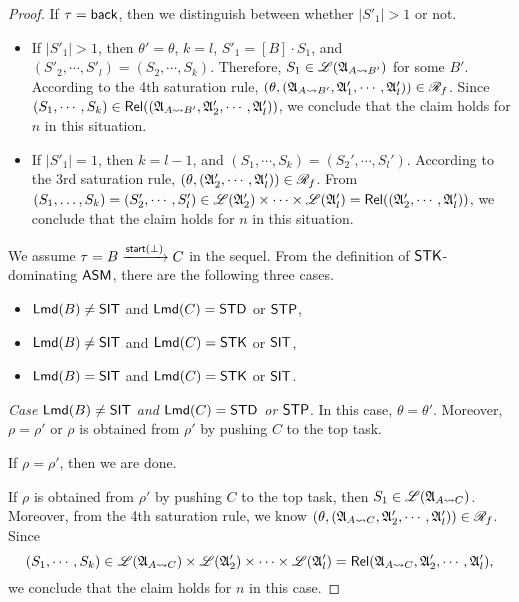 \begin{proof}
If $\tau = {\mathsf{back} }$, then we distinguish between whether $|S'_1| > 1$ or not. 
\begin{itemize}
\item If $|S'_1| > 1$, then $\theta' = \theta$, $k=l$, $S'_1 = [B] \cdot S_1$, and $(S'_2, \cdots, S'_l) = (S_2, \cdots, S_k)$. 
Therefore, $S_1 \in {\mathscr{L} }({\mathfrak{A} }_{A \rightsquigarrow B'})$ for some $B'$. According to the 4th saturation rule, $(\theta, ({\mathfrak{A} }_{A \rightsquigarrow B'}, {\mathfrak{A} }'_1, \cdots, {\mathfrak{A} }'_l)) \in \mathscr{R}_f$. Since $(S_1, \cdots, S_k) \in \mathsf{Rel}(({\mathfrak{A} }_{A \rightsquigarrow B'}, {\mathfrak{A} }'_2, \cdots, {\mathfrak{A} }'_l))$, we conclude that the claim holds for $n$ in this situation. 
%
\item If $|S'_1| = 1$, then $k = l - 1$, and $(S_1,\cdots,S_k) = (S_2',\cdots,S_l')$. According to the 3rd saturation rule, $(\theta, ({\mathfrak{A} }_2',\cdots,{\mathfrak{A} }_l')) \in \mathscr{R}_f$. From $(S_1,\dots,S_k) = (S'_2, \cdots, S'_l) \in {\mathscr{L} }({\mathfrak{A} }_2') \times \cdots \times {\mathscr{L} }({\mathfrak{A} }_l') = \mathsf{Rel}(({\mathfrak{A} }'_2, \cdots, {\mathfrak{A} }'_l))$, we conclude that the claim holds for $n$ in this situation. 
\end{itemize}


We assume $\tau = B \xrightarrow{{\mathsf{start} }(\bot)} C$ in the sequel. From the definition of ${\sf STK}$-dominating $\textsf{ASM}$, there are the following three cases. 
\begin{itemize}
\item ${\sf Lmd}(B) \neq {\sf SIT}$ and ${\sf Lmd}(C) = {\sf STD}$ or ${\sf STP}$, 
%
\item ${\sf Lmd}(B) \neq {\sf SIT}$ and ${\sf Lmd}(C) = {\sf STK}$ or ${\sf SIT}$, 
%
\item ${\sf Lmd}(B) = {\sf SIT}$ and ${\sf Lmd}(C) = {\sf STK}$ or ${\sf SIT}$. 
\end{itemize}

\smallskip

\noindent \emph{Case ${\sf Lmd}(B) \neq {\sf SIT}$ and ${\sf Lmd}(C) = {\sf STD}$ or ${\sf STP}$}. In this case, $\theta = \theta'$. Moreover, $\rho = \rho'$ or $\rho$ is obtained from $\rho'$ by pushing $C$ to the top task.

If $\rho = \rho'$, then we are done. 

If $\rho$ is obtained from $\rho'$ by pushing $C$ to the top task, then $S_1 \in {\mathscr{L} }({\mathfrak{A} }_{A \rightsquigarrow C})$. Moreover, from the 4th saturation rule, we know $(\theta, ({\mathfrak{A} }_{A \rightsquigarrow C}, {\mathfrak{A} }'_2, \cdots, {\mathfrak{A} }'_l)) \in \mathscr{R}_f$. 
Since 
$$(S_1, \cdots, S_k) \in {\mathscr{L} }({\mathfrak{A} }_{A \rightsquigarrow C}) \times {\mathscr{L} }({\mathfrak{A} }'_2) \times \cdots \times {\mathscr{L} }({\mathfrak{A} }'_l) = \mathsf{Rel}({\mathfrak{A} }_{A \rightsquigarrow C}, {\mathfrak{A} }'_2, \cdots, {\mathfrak{A} }'_l),$$ 
we conclude that the claim holds for $n$ in this case. 


\end{proof}
